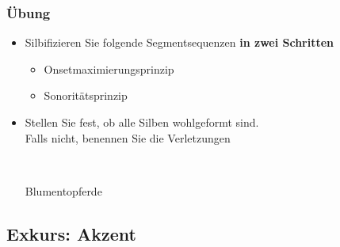 {\begin{frame}
\begin{itemize}
\begin{columns}
\end{columns}
\end{itemize}

\end{frame}




\begin{frame}
\frametitle{Übung}

\begin{itemize}
\item Silbifizieren Sie folgende Segmentsequenzen \textbf{in zwei Schritten}
\begin{itemize}
	\item Onsetmaximierungsprinzip
	\item Sonoritätsprinzip
\end{itemize}

\item Stellen Sie fest, ob alle Silben wohlgeformt sind.\\
Falls nicht, benennen Sie die Verletzungen

\ea
{}\\ \pause
{}



\ex
Blumentopferde\\ \pause
{}
\z

\end{itemize}



\end{frame}




}%


\subsection{Exkurs: Akzent}

